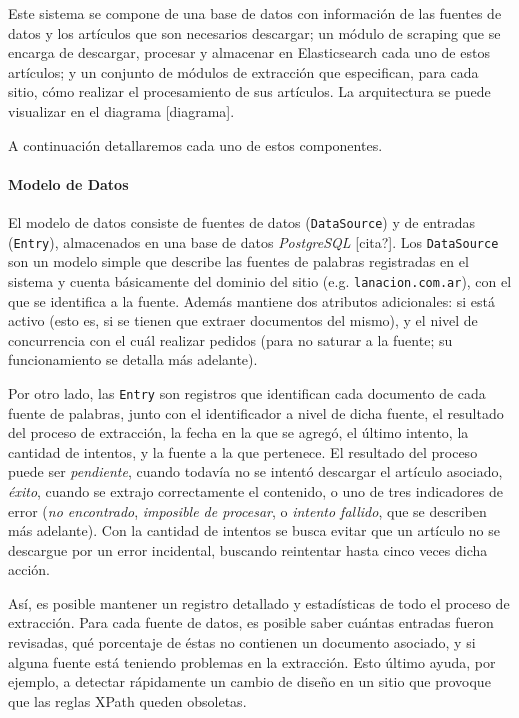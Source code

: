 Este sistema se compone de una base de datos con información de las fuentes de datos y los
artículos que son necesarios descargar; un módulo de scraping que se encarga de descargar, procesar
y almacenar en Elasticsearch cada uno de estos artículos; y un conjunto de módulos de extracción que
especifican, para cada sitio, cómo realizar el procesamiento de sus artículos. La arquitectura se
puede visualizar en el diagrama [diagrama].

A continuación detallaremos cada uno de estos componentes.


\paragraph{Modelo de Datos}

El modelo de datos consiste de fuentes de datos (\texttt{DataSource}) y de entradas
(\texttt{Entry}), almacenados en una base de datos \textit{PostgreSQL} [cita?]. Los
\texttt{DataSource} son un modelo simple que describe las fuentes de palabras registradas en el
sistema y cuenta básicamente del dominio del sitio (e.g. \texttt{lanacion.com.ar}), con el que se
identifica a la fuente. Además mantiene dos atributos adicionales: si está activo (esto es, si se
tienen que extraer documentos del mismo), y el nivel de concurrencia con el cuál realizar pedidos
(para no saturar a la fuente; su funcionamiento se detalla más adelante).

Por otro lado, las \texttt{Entry} son registros que identifican cada documento de cada fuente de
palabras, junto con el identificador a nivel de dicha fuente, el resultado del proceso de
extracción, la fecha en la que se agregó, el último intento, la cantidad de intentos, y la fuente a
la que pertenece. El resultado del proceso puede ser \textit{pendiente}, cuando todavía no se
intentó descargar el artículo asociado, \textit{éxito}, cuando se extrajo correctamente el
contenido, o uno de tres indicadores de error (\textit{no encontrado}, \textit{imposible de
procesar}, o \textit{intento fallido}, que se describen más adelante). Con la cantidad de intentos
se busca evitar que un artículo no se descargue por un error incidental, buscando reintentar hasta
cinco veces dicha acción.

Así, es posible mantener un registro detallado y estadísticas de todo el proceso de extracción. Para
cada fuente de datos, es posible saber cuántas entradas fueron revisadas, qué porcentaje de éstas no
contienen un documento asociado, y si alguna fuente está teniendo problemas en la extracción. Esto
último ayuda, por ejemplo, a detectar rápidamente un cambio de diseño en un sitio que provoque que
las reglas XPath queden obsoletas.


